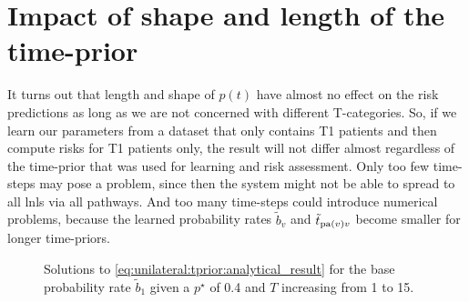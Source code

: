 \documentclass[\relativeRoot/main.tex]{subfiles}
\begin{document}
\section{Impact of shape and length of the time-prior}
\label{sec:unilateral:tprior}

It turns out that length and shape of $p(t)$ have almost no effect on the risk predictions as long as we are not concerned with different T-categories. So, if we learn our parameters from a dataset that only contains T1 patients and then compute risks for T1 patients only, the result will not differ almost regardless of the time-prior that was used for learning and risk assessment. Only too few time-steps may pose a problem, since then the system might not be able to spread to all \glspl{lnl} via all pathways. And too many time-steps could introduce numerical problems, because the learned probability rates $\tilde{b}_v$ and $\tilde{t}_{\operatorname{pa}(v)v}$  become smaller for longer time-priors.

\begin{figure}
    \centering
    \def\svgwidth{0.7\textwidth}
    
    \caption[Analytic solutions for the decay of spread probability rates]{Solutions to \cref{eq:unilateral:tprior:analytical_result} for the base probability rate $\tilde{b}_1$ given a $p^{\star}$ of 0.4 and $T$ increasing from 1 to 15.}
    \label{fig:unilateral:tprior:rate_decay_analytic}
\end{figure}
\end{document}
